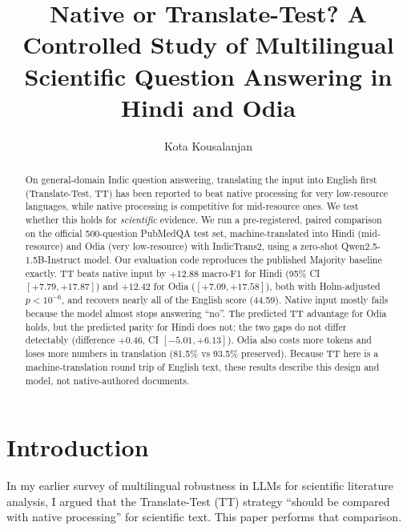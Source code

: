 \documentclass[acmsmall,nonacm]{acmart}
\begin{document}
\title{Native or Translate-Test? A Controlled Study of Multilingual Scientific Question Answering in Hindi and Odia}

\author{Kota Kousalanjan}

\begin{abstract}
On general-domain Indic question answering, translating the input into English first (Translate-Test, TT) has been reported to beat native processing for very low-resource languages, while native processing is competitive for mid-resource ones. We test whether this holds for \emph{scientific} evidence. We run a pre-registered, paired comparison on the official 500-question PubMedQA test set, machine-translated into Hindi (mid-resource) and Odia (very low-resource) with IndicTrans2, using a zero-shot Qwen2.5-1.5B-Instruct model. Our evaluation code reproduces the published Majority baseline exactly. TT beats native input by $+12.88$ macro-F1 for Hindi (95\% CI $[+7.79, +17.87]$) and $+12.42$ for Odia ($[+7.09, +17.58]$), both with Holm-adjusted $p < 10^{-6}$, and recovers nearly all of the English score (44.59). Native input mostly fails because the model almost stops answering ``no''. The predicted TT advantage for Odia holds, but the predicted parity for Hindi does not: the two gaps do not differ detectably (difference $+0.46$, CI $[-5.01, +6.13]$). Odia also costs more tokens and loses more numbers in translation (81.5\% vs 93.5\% preserved). Because TT here is a machine-translation round trip of English text, these results describe this design and model, not native-authored documents.
\end{abstract}


\maketitle

\section{Introduction}

In my earlier survey of multilingual robustness in LLMs for scientific literature analysis, I argued that the Translate-Test (TT) strategy ``should be compared with native processing'' for scientific text. This paper performs that comparison.
\end{document}
